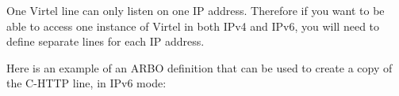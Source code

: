 \documentclass[letterpaper,10pt,english]{sphinxmanual}
\begin{document}
One Virtel line can only listen on one IP address. Therefore if you want to be able to access one instance of Virtel in both IPv4 and IPv6, you will need to define separate lines for each IP address.

Here is an example of an ARBO definition that can be used to create a copy of the C-HTTP line, in IPv6 mode:

\begin{sphinxVerbatim}[commandchars=\\\{\}]
                                                  
                                                   
                           
                                
                                                     
                                                  
                                                       
                                                         
                                                
                                                    
                                                        
                                                      
                                                      
                                                      
                                             

\end{sphinxVerbatim}
\end{document}
